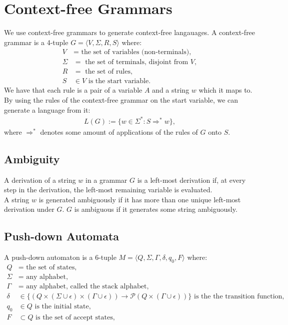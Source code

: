 \section{Context-free Grammars}

We use context-free grammars to generate context-free langauages. 
A context-free grammar
is a 4-tuple $G = \langle V, \Sigma, R, S \rangle$ where: \begin{align*}
    V      &= \text{ the set of variables (non-terminals),}\\
    \Sigma &= \text{ the set of terminals, disjoint from } V, \\
    R      &= \text{ the set of rules},\\
    S      &\in V \text{ is the start variable}.
\end{align*} We have that each rule is a pair of a variable $A$ and a string $w$
which it maps to.
\\[\baselineskip]
By using the rules of the context-free grammar on the start variable, we can
generate a language from it: \begin{gather*}
    L(G) := \{w \in \Sigma^* : S \Rightarrow^* w \},
\end{gather*} where $\Rightarrow^*$ denotes some amount of applications
of the rules of $G$ onto $S$.

\subsection{Ambiguity}

A derivation of a string $w$ in a grammar $G$ is a
left-most derivation if, at every step in the derivation,
the left-most remaining variable is evaluated.
\\[\baselineskip]
A string $w$ is generated ambiguously if it has more than
one unique left-most derivation under $G$. $G$ is ambiguous
if it generates some string ambiguously.

\subsection{Push-down Automata}

A push-down automaton is a 6-tuple
$M = \langle Q, \Sigma, \Gamma, \delta, q_0, F \rangle$ where:
\begin{align*}
    Q      &= \text{ the set of states,} \\
    \Sigma &= \text{ any alphabet,} \\ 
    \Gamma &= \text{ any alphabet, called the stack alphabet,} \\ 
    \delta &\in \big\{ 
        (Q \times (\Sigma \cup \epsilon) \times (\Gamma \cup \epsilon))
        \to \mathcal{P}(Q \times (\Gamma \cup \epsilon))
        \big\} \text{ is the the transition function,} \\
    q_0    &\in Q \text{ is the initial state,} \\
    F      &\subset Q \text{ is the set of accept states,}
\end{align*} 

